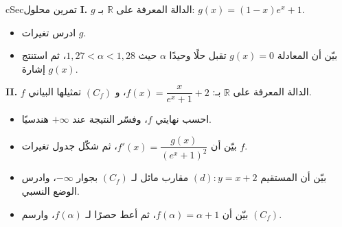 \documentclass[12pt,a4paper]{article}
\newenvironment{BOX}[2]{\begin{otherlanguage}{english}\begin{arbox}{#1}{#2}}{\end{arbox}\end{otherlanguage}}
\newcounter{exo}
\newcommand{\R}{\mathbb{R}}
\newenvironment{sq}{\begin{itemize}[leftmargin=2.4em,itemsep=3pt]}{\end{itemize}}
\newcommand{\qa}{\item[(أ)]}\newcommand{\qb}{\item[(ب)]}\newcommand{\qc}{\item[(جـ)]}\newcommand{\qd}{\item[(د)]}\newcommand{\qe}{\item[(هـ)]}
\newenvironment{tmr}{\stepcounter{exo}\begin{BOX}{cSec}{تمرين محلول \theexo}}{\end{BOX}}
\let\origNeedspace\Needspace
\renewcommand{\Needspace}[1]{\origNeedspace{14\baselineskip}}
\begin{document}
\origNeedspace{20\baselineskip}
\begin{tmr}
\textbf{I.} $g$ الدالة المعرفة على $\R$ بـ: $g(x)=(1-x)e^{x}+1$.
\begin{sq}
\qa ادرس تغيرات $g$.
\qb بيّن أن المعادلة $g(x)=0$ تقبل حلًا وحيدًا $\alpha$ حيث $1{,}27<\alpha<1{,}28$، ثم استنتج إشارة $g(x)$.
\end{sq}
\textbf{II.} $f$ الدالة المعرفة على $\R$ بـ: $f(x)=\dfrac{x}{e^{x}+1}+2$، و $(C_f)$ تمثيلها البياني.
\begin{sq}
\qa احسب نهايتي $f$، وفسّر النتيجة عند $+\infty$ هندسيًا.
\qb بيّن أن $f'(x)=\dfrac{g(x)}{\left(e^{x}+1\right)^{2}}$، ثم شكّل جدول تغيرات $f$.
\qc بيّن أن المستقيم $(d):y=x+2$ مقارب مائل لـ $(C_f)$ بجوار $-\infty$، وادرس الوضع النسبي.
\qd بيّن أن $f(\alpha)=\alpha+1$، ثم أعط حصرًا لـ $f(\alpha)$، وارسم $(C_f)$.
\end{sq}
\end{tmr}
\end{document}
